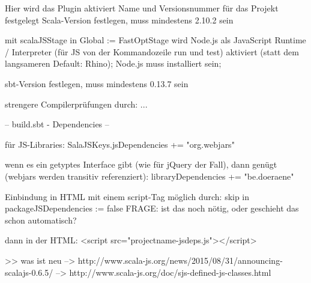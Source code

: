 \documentclass[a4paper, 12pt, hidelinks, listof=totoc, listoftables=totoc, bibliography=totoc]{scrreprt}
\begin{document}
Hier wird das Plugin aktiviert
Name und Versionsnummer für das Projekt festgelegt
Scala-Version festlegen, muss mindestens 2.10.2 sein

mit scalaJSStage in Global := FastOptStage wird Node.js als JavaScript Runtime / Interpreter (für JS von der Kommandozeile run und test) aktiviert (statt dem langsameren Default: Rhino); Node.js muss installiert sein;


sbt-Version festlegen, muss mindestens 0.13.7 sein


strengere Compilerprüfungen durch: ...


-- build.sbt - Dependencies --

für JS-Libraries:
SalaJSKeys.jsDependencies += "org.webjars" %

wenn es ein getyptes Interface gibt (wie für jQuery der Fall), dann genügt (webjars werden transitiv referenziert):
libraryDependencies += "be.doeraene" %

Einbindung in HTML mit einem script-Tag möglich durch:
skip in packageJSDependencies := false
FRAGE: ist das noch nötig, oder geschieht das schon automatisch?

dann in der HTML:
<script src="projectname-jsdeps.js"></script>











































>> was ist neu
  -->  http://www.scala-js.org/news/2015/08/31/announcing-scalajs-0.6.5/
  -->  http://www.scala-js.org/doc/sjs-defined-js-classes.html
\end{document}
